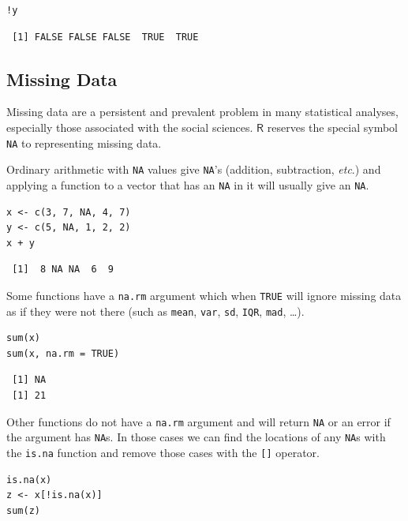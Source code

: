 \documentclass[captions=tableheading]{scrbook}
\begin{document}
\lstset{language=R}
\begin{lstlisting}
!y
\end{lstlisting}

\begin{verbatim}
 [1] FALSE FALSE FALSE  TRUE  TRUE
\end{verbatim}
\subsection{Missing Data}
\label{sec-3-1-6}
\label{sub-Missing-Data}


Missing data are a persistent and prevalent problem in many statistical analyses, especially those associated with the social sciences. \(\mathsf{R}\) reserves the special symbol \texttt{NA} to representing missing data.

Ordinary arithmetic with \texttt{NA} values give \texttt{NA}'s (addition, subtraction, \emph{etc}.) and applying a function to a vector that has an \texttt{NA} in it will usually give an \texttt{NA}.


\lstset{language=R}
\begin{lstlisting}
x <- c(3, 7, NA, 4, 7)
y <- c(5, NA, 1, 2, 2)
x + y
\end{lstlisting}

\begin{verbatim}
 [1]  8 NA NA  6  9
\end{verbatim}

Some functions have a \texttt{na.rm} argument which when \texttt{TRUE} will ignore missing data as if they were not there (such as \texttt{mean}, \texttt{var}, \texttt{sd}, \texttt{IQR}, \texttt{mad}, \ldots{}). 


\lstset{language=R}
\begin{lstlisting}
sum(x)
sum(x, na.rm = TRUE)
\end{lstlisting}

\begin{verbatim}
 [1] NA
 [1] 21
\end{verbatim}

Other functions do not have a \texttt{na.rm} argument and will return \texttt{NA} or an error if the argument has \texttt{NA}s. In those cases we can find the locations of any \texttt{NA}s with the \texttt{is.na} function and remove those cases with the \texttt{[]} operator.


\lstset{language=R}
\begin{lstlisting}
is.na(x)
z <- x[!is.na(x)]
sum(z)
\end{lstlisting}
\end{document}
